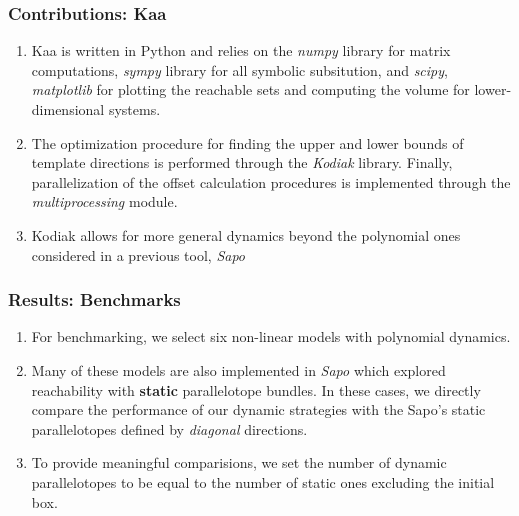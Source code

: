 \documentclass{beamer}
\begin{document}
\begin{frame}
  \frametitle{\textbf{Contributions:} Kaa}
  \begin{enumerate}
    \item Kaa is written in Python and relies on the \emph{numpy} library for matrix computations, \emph{sympy} library for all symbolic subsitution, and \emph{scipy}, \emph{matplotlib} for plotting the reachable sets and computing the volume for lower-dimensional systems.

    \item The optimization procedure for finding the upper and lower bounds of template directions  is performed through the \emph{Kodiak} library. Finally, parallelization of the offset calculation procedures is implemented through the \emph{multiprocessing} module.

    \item Kodiak allows for more general dynamics beyond the polynomial ones considered in a previous tool, \emph{Sapo}
  \end{enumerate}
\end{frame}

\begin{frame}
  \frametitle{\textbf{Results:} Benchmarks}
  \begin{enumerate}
    \item For benchmarking, we select six non-linear models with polynomial dynamics.
    \item Many of these models are also implemented in \emph{Sapo} which explored reachability with {\bf static} parallelotope bundles. In these cases, we directly compare the performance of our dynamic strategies with the Sapo's static parallelotopes defined by \emph{diagonal} directions.
    \item To provide meaningful comparisions, we set the number of dynamic parallelotopes to be equal to the number of static ones excluding the initial box.
  \end{enumerate}
\end{frame}
\end{document}
